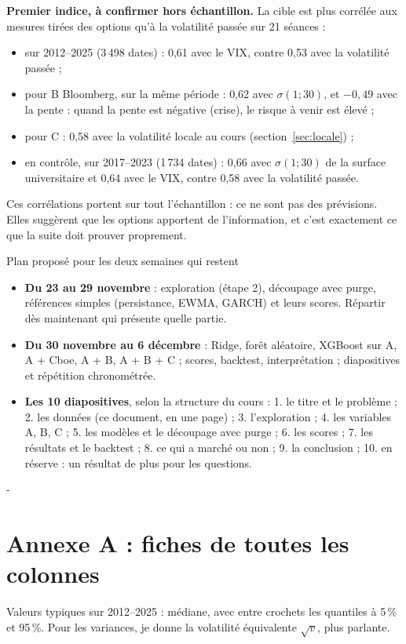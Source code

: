 \documentclass[10pt,a4paper]{article}
\makeatletter
\newcommand{\besoin}[1]{\par\penalty-100\begingroup\setlength{\dimen@}{#1}%
  \dimen@ii\pagegoal\advance\dimen@ii-\pagetotal
  \ifdim\dimen@>\dimen@ii\ifdim\dimen@ii>\z@\vfil\fi\break\fi\endgroup}
\let\sectionorigine\section
\renewcommand{\section}{\besoin{6\baselineskip}\sectionorigine}
\makeatother
\begin{document}
\textbf{Premier indice, à confirmer hors échantillon.} La cible est plus corrélée aux mesures tirées des options qu'à la volatilité passée sur 21 séances :
\begin{itemize}[nosep]
\item sur 2012–2025 (3\,498 dates) : 0,61 avec le VIX, contre 0,53 avec la volatilité passée ;
\item pour B Bloomberg, sur la même période : 0,62 avec $\sigma(1;30)$, et $-0{,}49$ avec la pente : quand la pente est négative (crise), le risque à venir est élevé ;
\item pour C : 0,58 avec la volatilité locale au cours (section~\ref{sec:locale}) ;
\item en contrôle, sur 2017–2023 (1\,734 dates) : 0,66 avec $\sigma(1;30)$ de la surface universitaire et 0,64 avec le VIX, contre 0,58 avec la volatilité passée.
\end{itemize}
Ces corrélations portent sur tout l'échantillon : ce ne sont pas des prévisions. Elles suggèrent que les options apportent de l'information, et c'est exactement ce que la suite doit prouver proprement.

\begin{retenir}{Plan proposé pour les deux semaines qui restent}
\begin{itemize}[leftmargin=1.2em,nosep]
\item \textbf{Du 23 au 29 novembre} : exploration (étape 2), découpage avec purge, références simples (persistance, EWMA, GARCH) et leurs scores. Répartir dès maintenant qui présente quelle partie.
\item \textbf{Du 30 novembre au 6 décembre} : Ridge, forêt aléatoire, XGBoost sur A, A + Cboe, A + B, A + B + C ; scores, backtest, interprétation ; diapositives et répétition chronométrée.
\item \textbf{Les 10 diapositives}, selon la structure du cours : 1. le titre et le problème ; 2. les données (ce document, en une page) ; 3. l'exploration ; 4. les variables A, B, C ; 5. les modèles et le découpage avec purge ; 6. les scores ; 7. les résultats et le backtest ; 8. ce qui a marché ou non ; 9. la conclusion ; 10. en réserve : un résultat de plus pour les questions.
\end{itemize}
\end{retenir}

\section{Annexe A : fiches de toutes les colonnes}\label{sec:fiches}
Valeurs typiques sur 2012–2025 : médiane, avec entre crochets les quantiles à 5\,\% et 95\,\%. Pour les variances, je donne la volatilité équivalente $\sqrt{v}$, plus parlante.
\end{document}

